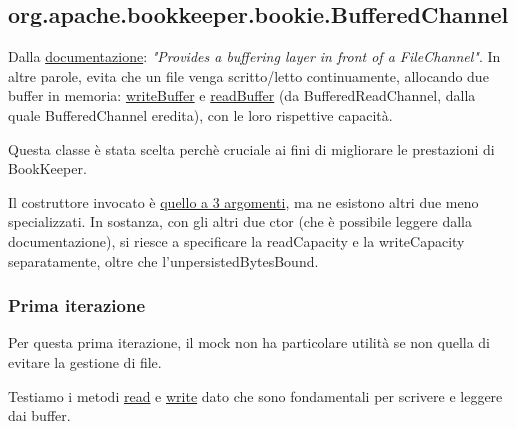 \documentclass[10pt, a4paper]{article}
\def\bookkeeper{BookKeeper}
\begin{document}
	\subsection{org.apache.bookkeeper.bookie.BufferedChannel}
	Dalla 
	\href{https://bookkeeper.apache.org/docs/latest/api/javadoc/org/apache/bookkeeper/bookie/BufferedChannel.html}
	{documentazione}: \textit{"Provides a buffering layer in front of a FileChannel"}.
	In altre parole, evita che un file venga scritto/letto continuamente, allocando due buffer in memoria:
	\href{https://bookkeeper.apache.org/docs/latest/api/javadoc/org/apache/bookkeeper/bookie/BufferedChannel.html#writeBuffer}
	{writeBuffer} e 
	\href{https://bookkeeper.apache.org/docs/latest/api/javadoc/org/apache/bookkeeper/bookie/BufferedReadChannel.html#readBuffer}
	{readBuffer} (da BufferedReadChannel, dalla quale BufferedChannel eredita), con le loro rispettive capacità.
	
	Questa classe è stata scelta perchè cruciale ai fini di migliorare le prestazioni di \bookkeeper.
	
	Il costruttore invocato è \href{https://bookkeeper.apache.org/docs/latest/api/javadoc/org/apache/bookkeeper/bookie/BufferedChannel.html#\%3Cinit\%3E(io.netty.buffer.ByteBufAllocator,java.nio.channels.FileChannel,int)}
	{quello a 3 argomenti}, ma ne esistono altri due meno specializzati. In sostanza, con gli altri due ctor
	(che è possibile leggere dalla documentazione), si riesce a specificare la readCapacity e la writeCapacity
	separatamente, oltre che l'unpersistedBytesBound.
	
	\subsubsection{Prima iterazione}
	Per questa prima iterazione, il mock non ha particolare utilità se non quella di evitare la gestione di file.
	
	Testiamo i metodi 
	\href{https://bookkeeper.apache.org/docs/latest/api/javadoc/org/apache/bookkeeper/bookie/BufferedChannel.html#read(io.netty.buffer.ByteBuf,long,int)}
	{read} e
	\href{https://bookkeeper.apache.org/docs/latest/api/javadoc/org/apache/bookkeeper/bookie/BufferedChannel.html#write(io.netty.buffer.ByteBuf)}
	{write}
	dato che sono fondamentali per scrivere e leggere dai buffer.
	
\end{document}
